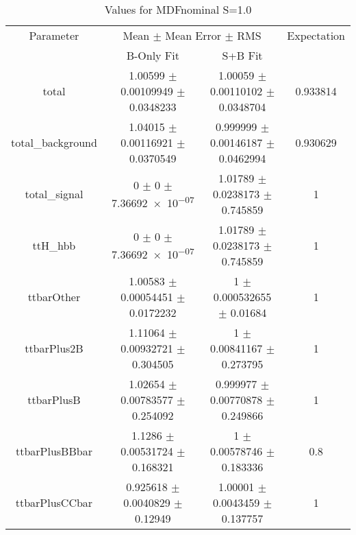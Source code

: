 \begin{table}
\centering
\caption{Values for MDFnominal S=1.0}
\begin{tabular}{cccc}
\toprule
Parameter & \multicolumn{2}{c}{Mean $\pm$ Mean Error $\pm$ RMS} & Expectation\\
 & B-Only Fit & S+B Fit & \\
\midrule
total & \num{1.00599} $\pm$ \num{0.00109949} $\pm$ \num{0.0348233} & \num{1.00059} $\pm$ \num{0.00110102} $\pm$ \num{0.0348704} & \num{0.933814}\\
total\_background & \num{1.04015} $\pm$ \num{0.00116921} $\pm$ \num{0.0370549} & \num{0.999999} $\pm$ \num{0.00146187} $\pm$ \num{0.0462994} & \num{0.930629}\\
total\_signal & \num{0} $\pm$ \num{0} $\pm$ \num{7.36692e-07} & \num{1.01789} $\pm$ \num{0.0238173} $\pm$ \num{0.745859} & \num{1}\\
ttH\_hbb & \num{0} $\pm$ \num{0} $\pm$ \num{7.36692e-07} & \num{1.01789} $\pm$ \num{0.0238173} $\pm$ \num{0.745859} & \num{1}\\
ttbarOther & \num{1.00583} $\pm$ \num{0.00054451} $\pm$ \num{0.0172232} & \num{1} $\pm$ \num{0.000532655} $\pm$ \num{0.01684} & \num{1}\\
ttbarPlus2B & \num{1.11064} $\pm$ \num{0.00932721} $\pm$ \num{0.304505} & \num{1} $\pm$ \num{0.00841167} $\pm$ \num{0.273795} & \num{1}\\
ttbarPlusB & \num{1.02654} $\pm$ \num{0.00783577} $\pm$ \num{0.254092} & \num{0.999977} $\pm$ \num{0.00770878} $\pm$ \num{0.249866} & \num{1}\\
ttbarPlusBBbar & \num{1.1286} $\pm$ \num{0.00531724} $\pm$ \num{0.168321} & \num{1} $\pm$ \num{0.00578746} $\pm$ \num{0.183336} & \num{0.8}\\
ttbarPlusCCbar & \num{0.925618} $\pm$ \num{0.0040829} $\pm$ \num{0.12949} & \num{1.00001} $\pm$ \num{0.0043459} $\pm$ \num{0.137757} & \num{1}\\
\bottomrule
\end{tabular}
\end{table}